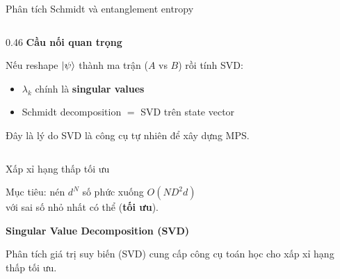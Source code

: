 \documentclass[aspectratio=169, 11pt]{beamer}
\newcommand{\highlight}[1]{\textcolor{qcyan}{\textbf{#1}}}
\begin{document}
\begin{frame}[shrink=5]{Phân tích Schmidt và entanglement entropy}
\begin{columns}[T]
\begin{column}{0.46\textwidth}
\vspace{8pt}
\textcolor{qamber}{\textbf{Cầu nối quan trọng}}\\[3pt]
{\small Nếu reshape $\ket{\psi}$ thành ma trận ($A$ vs $B$) rồi tính SVD:
\begin{itemize}
  \item $\lambda_k$ chính là \textbf{singular values}
  \item Schmidt decomposition $=$ SVD trên state vector
\end{itemize}
Đây là lý do SVD là công cụ tự nhiên để xây dựng MPS.}

\end{column}
\end{columns}

\end{frame}

\begin{frame}{Xấp xỉ hạng thấp tối ưu}

\vspace{20pt}
\begin{center}
{\large Mục tiêu: nén $d^N$ số phức xuống $O(ND^2 d)$\\[10pt]
với sai số nhỏ nhất có thể (\highlight{tối ưu}).}
\end{center}

\vspace{20pt}
\begin{center}
{\Large\textcolor{qpurple}{\textbf{Singular Value Decomposition (SVD)}}}
\end{center}

\vspace{8pt}
{\small\textcolor{dimtext}{Phân tích giá trị suy biến (SVD) cung cấp công cụ toán học cho xấp xỉ hạng thấp tối ưu.}}

\end{frame}
\end{document}
